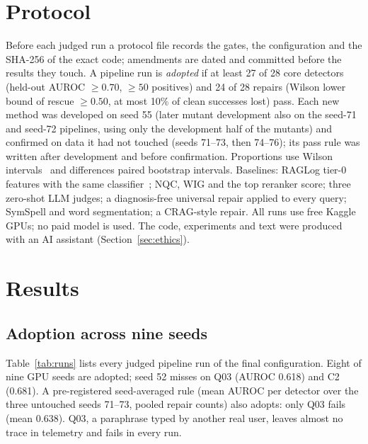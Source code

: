 \documentclass[conference]{IEEEtran}
\begin{document}
\section{Protocol}\label{sec:protocol}
Before each judged run a protocol file records the gates, the configuration and the SHA-256 of the exact code; amendments are dated and committed before the results they touch. A pipeline run is \emph{adopted} if at least 27 of 28 core detectors (held-out AUROC $\ge0.70$, $\ge50$ positives) and 24 of 28 repairs (Wilson lower bound of rescue $\ge0.50$, at most 10\% of clean successes lost) pass. Each new method was developed on seed 55 (later mutant development also on the seed-71 and seed-72 pipelines, using only the development half of the mutants) and confirmed on data it had not touched (seeds 71--73, then 74--76); its pass rule was written after development and before confirmation. Proportions use Wilson intervals~\cite{wilson1927} and differences paired bootstrap intervals. Baselines: RAGLog tier-0 features with the same classifier~\cite{raglog}; NQC, WIG and the top reranker score; three zero-shot LLM judges; a diagnosis-free universal repair applied to every query; SymSpell and word segmentation; a CRAG-style repair. All runs use free Kaggle GPUs; no paid model is used. The code, experiments and text were produced with an AI assistant (Section~\ref{sec:ethics}).

\section{Results}\label{sec:results}
\subsection{Adoption across nine seeds}
Table~\ref{tab:runs} lists every judged pipeline run of the final configuration. Eight of nine GPU seeds are adopted; seed 52 misses on Q03 (AUROC 0.618) and C2 (0.681). A pre-registered seed-averaged rule (mean AUROC per detector over the three untouched seeds 71--73, pooled repair counts) also adopts: only Q03 fails (mean 0.638). Q03, a paraphrase typed by another real user, leaves almost no trace in telemetry and fails in every run.
\end{document}

